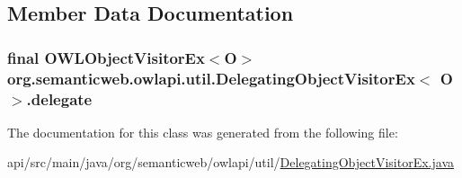 \subsection{Member Data Documentation}
\hypertarget{classorg_1_1semanticweb_1_1owlapi_1_1util_1_1_delegating_object_visitor_ex_3_01_o_01_4_a5d357422bfba7c8d47fd65eb2b96f076}{
\subsubsection[{delegate}]{\setlength{\rightskip}{0pt plus 5cm}final O\-W\-L\-Object\-Visitor\-Ex$<$O$>$ org.\-semanticweb.\-owlapi.\-util.\-Delegating\-Object\-Visitor\-Ex$<$ O $>$.delegate\hspace{0.3cm}{\ttfamily [private]}}}\label{classorg_1_1semanticweb_1_1owlapi_1_1util_1_1_delegating_object_visitor_ex_3_01_o_01_4_a5d357422bfba7c8d47fd65eb2b96f076}


The documentation for this class was generated from the following file\-:\begin{DoxyCompactItemize}
\item 
api/src/main/java/org/semanticweb/owlapi/util/\hyperlink{_delegating_object_visitor_ex_8java}{Delegating\-Object\-Visitor\-Ex.\-java}\end{DoxyCompactItemize}
